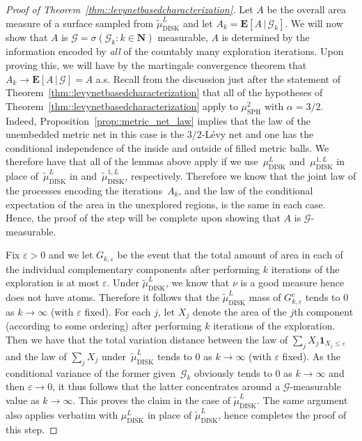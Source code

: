 \documentclass[JEP,XML,SOM,Unicode]{cedram}
\let\mathcal\mathscr
\let\epsilon\varepsilon
\theoremstyle{plain}
\numberwithin{theorem}{section}
\theoremstyle{definition}
\newcommand{\CG}{{\mathcal G}}
\newcommand \E {{\mathbf E}}
\newcommand{\N}{\mathbf{N}}
\newcommand{\one}{{\mathbf 1}}
\newcommand{\mustwo}{\mu_{\mathrm{SPH}}^2}
\newcommand{\mudonel}{\mu_{ \mathrm{DISK}}^{1, L}}
\newcommand{\mudl}{\mu_{\mathrm{DISK}}^L}
\newcommand{\tmudonel}{\wt{\mu}_{ \mathrm{DISK}}^{1, L}}
\newcommand{\tmudl}{\wt{\mu}_{\mathrm{DISK}}^L}
\let\wt\widetilde
\newcommand{\giv}{\,|\,}
\begin{document}
\begin{proof}[Proof of Theorem~\ref{thm::levynetbasedcharacterization}]
Let $A$ be the overall area measure of a surface sampled from $\tmudl$ and let $A_k = \E[ A \giv \CG_k]$. We will now show that $A$ is $\CG =\sigma(\CG_k : k \in \N)$ measurable, \ie $A$ is determined by the information encoded by \emph{all} of the countably many exploration iterations. Upon proving this, we will have by the martingale convergence theorem that $A_k \to \E[ A \giv \CG] = A$ a.s. Recall from the discussion just after the statement of Theorem~\ref{thm::levynetbasedcharacterization} that all of the hypotheses of Theorem~\ref{thm::levynetbasedcharacterization} apply to $\mustwo$ with $\alpha = 3/2$. Indeed, Proposition~\ref{prop::metric_net_law} implies that the law of the unembedded metric net in this case is the $3/2$-Lévy net and one has the conditional independence of the inside and outside of filled metric balls. We therefore have that all of the lemmas above apply if we use~$\mudl$ and~$\mudonel$ in place of~$\tmudl$ in and~$\tmudonel$, respectively. Therefore we know that the joint law of the processes encoding the iterations~$A_k$, and the law of the conditional expectation of the area in the unexplored regions, is the same in each case. Hence, the proof of the step will be complete upon showing that $A$ is $\CG$-measurable.

Fix $\epsilon > 0$ and we let $G_{k,\epsilon}$ be the event that the total amount of area in each of the individual complementary components after performing $k$ iterations of the exploration is at most $\epsilon$. Under $\tmudl$, we know that $\nu$ is a good measure hence does not have atoms. Therefore it follows that the $\tmudl$ mass of $G_{k,\epsilon}^c$ tends to $0$ as $k \to \infty$ (with $\epsilon$ fixed). For each $j$, let $X_j$ denote the area of the $j$th component (according to some ordering) after performing $k$ iterations of the exploration. Then we have that the total variation distance between the law of $\sum_j X_j \one_{X_j \leq \epsilon}$ and the law of $\sum_j X_j$ under~$\tmudl$ tends to $0$ as $k \to \infty$ (with $\epsilon$ fixed). As the conditional variance of the former given~$\CG_k$ obviously tends to $0$ as $k \to \infty$ and then $\epsilon \to 0$, it thus follows that the latter concentrates around a $\CG$-measurable value as $k \to \infty$. This proves the claim in the case of $\tmudl$. The same argument also applies verbatim with $\mudl$ in place of $\tmudl$, hence completes the proof of this step.


\end{proof}
\end{document}
